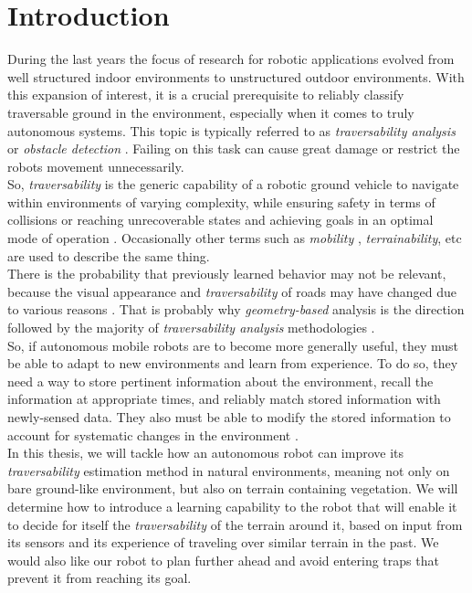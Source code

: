 \documentclass[12pt,a4paper]{report}
\newcommand{\term}{\textit}
\begin{document}
	{
		\hypersetup{linkcolor=black}
		\tableofcontents
	}
	
	\chapter{Introduction}
	\label{sec:intro}
	
	During the last years the focus of research for robotic applications evolved 
	from well structured indoor environments to unstructured outdoor environments. 
	With this expansion of interest, it is a crucial prerequisite to reliably 
	classify traversable ground in the environment, especially when it comes to 
	truly autonomous systems. This topic is typically referred to as 
	\term{traversability analysis} or \term{obstacle detection} \cite{Suger}. 
	Failing on this	task can cause great damage or restrict the robots movement 
	unnecessarily.
	\\
	
	So, \term{traversability} is the generic capability of a robotic ground 
	vehicle to navigate within environments of varying complexity, while ensuring 
	safety in terms of collisions or reaching unrecoverable states and achieving 
	goals in an optimal mode of operation \cite{Papadakis}. Occasionally other 
	terms such as \term{mobility} \cite{Lalonde}, \term{terrainability}, etc are 
	used to describe the same thing.
	\\
		
	There is the probability that previously learned behavior may not be relevant, 
	because the visual appearance and \term{traversability} of roads may have 
	changed due to various reasons \cite{Wigness}. That is probably why 
	\term{geometry-based} analysis is the direction followed by the majority of 
	\term{traversability analysis} methodologies \cite{Papadakis}.
	\\
	
	So, if autonomous mobile robots are to become more generally useful, they must 
	be able to adapt to new environments and learn from experience. To do so, they 
	need a way to store pertinent information about the environment, recall the 
	information at appropriate times, and reliably match stored information with 
	newly-sensed data. They also must be able to modify the stored information to 
	account for systematic changes in the environment \cite{Shneier}.
	\\
	
	In this thesis, we will tackle how an autonomous robot can improve its 
	\term{traversability} estimation method in natural environments, meaning not 
	only on bare ground-like environment, but also on terrain containing vegetation. 
	We will determine how to introduce a learning capability to the robot that will 
	enable it to decide for itself the \term{traversability} of the terrain around 
	it, based on input from its sensors and its experience of traveling over similar 
	terrain in the past. We would also like our robot to plan further ahead	and 
	avoid entering traps that prevent it from reaching its goal.
	\\
	
\end{document}
